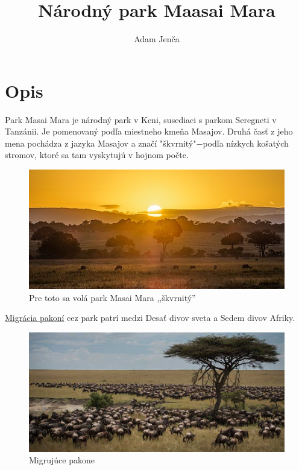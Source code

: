 \documentclass{article}
\title{Národný park Maasai Mara}
\author{Adam Jenča}
\begin{document}
\maketitle
{{\tableofcontents{}}}
\newpage
\section{Opis}
Park Masai Mara je národný park v Keni, susediaci s parkom Seregneti v Tanzánii.
Je pomenovaný podľa miestneho kmeňa Masajov.
Druhá časť z jeho mena pochádza z jazyka Masajov a značí "škvrnitý"$-$podľa nízkych košatých stromov, ktoré sa tam vyskytujú v hojnom počte.\\

\begin{figure}[h]
\centering
\includegraphics[scale=0.65]{mara-skvrnity.jpg} \caption{Pre toto sa volá park Masai Mara ,,škvrnitý''}
\end{figure}

\noindent
 \hyperref[greatmigration]{Migrácia pakoní} cez park patrí medzi Desať divov sveta a Sedem divov Afriky.
\vskip 5mm
%

\begin{figure}[h]
\centering
\includegraphics[scale=0.35]{migracia-velka.jpg} \caption{Migrujúce pakone}
\end{figure}
\end{document}
